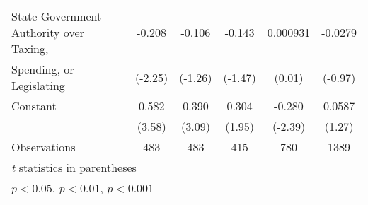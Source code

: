 {\begin{tabular}{l*{5}{c}}
\addlinespace
State Government Authority over Taxing, &-0.208\sym{*}  &-0.106         &-0.143         &0.000931         &-0.0279         \\
Spending, or Legislating                &(-2.25)         &(-1.26)         &(-1.47)         &(0.01)         &(-0.97)         \\
\addlinespace
Constant                                &0.582\sym{***}&0.390\sym{**} &0.304         &-0.280\sym{*}  &0.0587         \\
                                        &(3.58)         &(3.09)         &(1.95)         &(-2.39)         &(1.27)         \\
\midrule
Observations                            &  483         &  483         &  415         &  780         & 1389         \\
\bottomrule
\multicolumn{6}{l}{\footnotesize \textit{t} statistics in parentheses}\\
\multicolumn{6}{l}{\footnotesize \sym{*} \(p<0.05\), \sym{**} \(p<0.01\), \sym{***} \(p<0.001\)}\\
\end{tabular}
}
